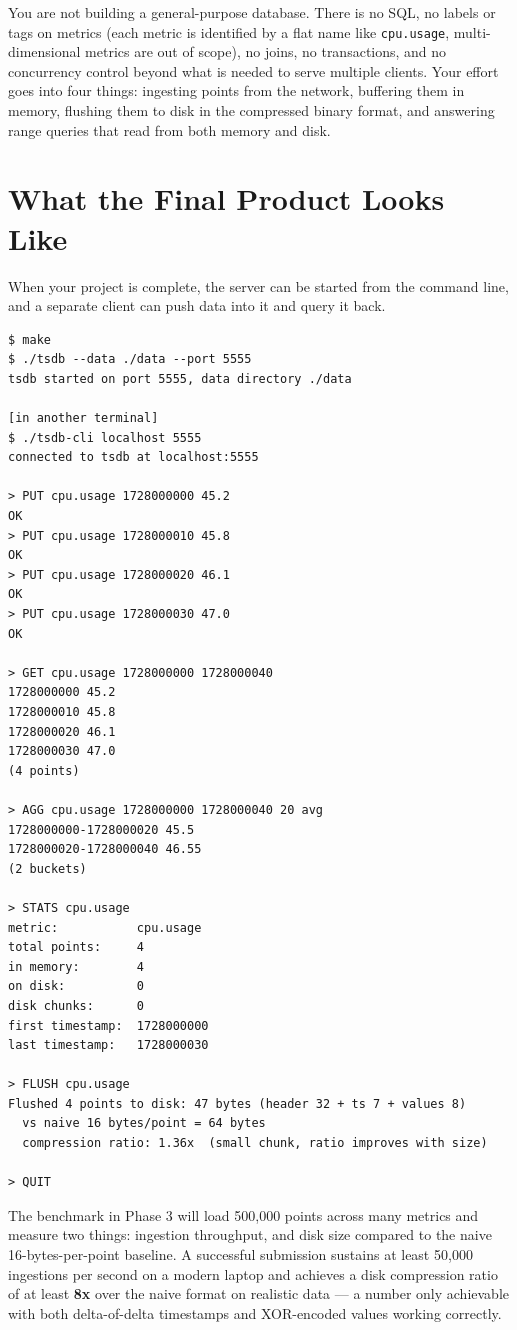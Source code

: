 \documentclass[11pt,a4paper]{article}
\begin{document}
You are not building a general-purpose database. There is no SQL, no labels or tags on metrics (each metric is identified by a flat name like \texttt{cpu.usage}, multi-dimensional metrics are out of scope), no joins, no transactions, and no concurrency control beyond what is needed to serve multiple clients. Your effort goes into four things: ingesting points from the network, buffering them in memory, flushing them to disk in the compressed binary format, and answering range queries that read from both memory and disk.

\section{What the Final Product Looks Like}

When your project is complete, the server can be started from the command line, and a separate client can push data into it and query it back.

\begin{codebox}
\begin{lstlisting}
$ make
$ ./tsdb --data ./data --port 5555
tsdb started on port 5555, data directory ./data

[in another terminal]
$ ./tsdb-cli localhost 5555
connected to tsdb at localhost:5555

> PUT cpu.usage 1728000000 45.2
OK
> PUT cpu.usage 1728000010 45.8
OK
> PUT cpu.usage 1728000020 46.1
OK
> PUT cpu.usage 1728000030 47.0
OK

> GET cpu.usage 1728000000 1728000040
1728000000 45.2
1728000010 45.8
1728000020 46.1
1728000030 47.0
(4 points)

> AGG cpu.usage 1728000000 1728000040 20 avg
1728000000-1728000020 45.5
1728000020-1728000040 46.55
(2 buckets)

> STATS cpu.usage
metric:           cpu.usage
total points:     4
in memory:        4
on disk:          0
disk chunks:      0
first timestamp:  1728000000
last timestamp:   1728000030

> FLUSH cpu.usage
Flushed 4 points to disk: 47 bytes (header 32 + ts 7 + values 8)
  vs naive 16 bytes/point = 64 bytes
  compression ratio: 1.36x  (small chunk, ratio improves with size)

> QUIT
\end{lstlisting}
\end{codebox}

The benchmark in Phase 3 will load 500{,}000 points across many metrics and measure two things: ingestion throughput, and disk size compared to the naive 16-bytes-per-point baseline. A successful submission sustains at least 50{,}000 ingestions per second on a modern laptop and achieves a disk compression ratio of at least \textbf{8x} over the naive format on realistic data --- a number only achievable with both delta-of-delta timestamps and XOR-encoded values working correctly.
\end{document}
